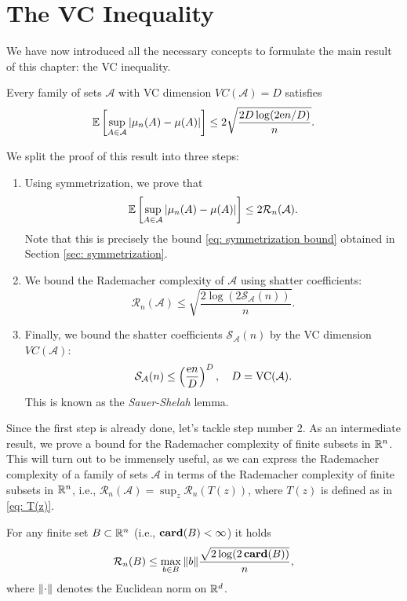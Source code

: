 \section{The VC Inequality}
\label{sec: VC inequality}

We have now introduced all the necessary concepts to formulate the main result of this chapter: the VC inequality.

\begin{theorem}[VC Inequality]
Every family of sets $\mathcal{A}$ with VC dimension $VC(\mathcal{A}) = D$ satisfies
\[
    \mathbb{E}\left[ \sup_{A \in \mathcal{A}} \abs{\mu_n(A) - \mu(A)} \right] \leq 2 \sqrt{\frac{2D \log(2 \mathrm{e} n / D)}{n}}.
\]
\end{theorem}

We split the proof of this result into three steps:

\begin{enumerate}
    \item Using symmetrization, we prove that
    \[
        \mathbb{E}\left[ \sup_{A \in \mathcal{A}} \abs{\mu_n(A) - \mu(A)} \right] \leq 2 \mathcal{R}_n(\mathcal{A}).
    \]
    Note that this is precisely the bound \eqref{eq: symmetrization bound} obtained in Section \ref{sec: symmetrization}.

    \item We bound the Rademacher complexity of $\mathcal{A}$ using shatter coefficients:
    \[
        \mathcal{R}_n(\mathcal{A}) \leq \sqrt{ \frac{2 \log(2 \mathcal{S}_{\mathcal{A}}(n)) }{n} }.
    \]

    \item Finally, we bound the shatter coefficients $\mathcal{S}_{\mathcal{A}}(n)$ by the VC dimension $VC(\mathcal{A})$:
    \[
        \mathcal{S}_{\mathcal{A}}(n) \leq \left( \frac{\mathrm{e} n}{D} \right)^D, \quad D = \mathrm{VC}(\mathcal{A}).
    \]
    This is known as the \emph{Sauer-Shelah} lemma.
\end{enumerate}

Since the first step is already done, let's tackle step number 2. As an intermediate result, we prove a bound for the Rademacher complexity of finite subsets in $\mathbb{R}^n$. This will turn out to be immensely useful, as we can express the Rademacher complexity of a family of sets $\mathcal{A}$ in terms of the Rademacher complexity of finite subsets in $\mathbb{R}^n$, i.e., $\mathcal{R}_n(\mathcal{A}) = \sup_z \mathcal{R}_n(T(z))$, where $T(z)$ is defined as in \eqref{eq: T(z)}.

\begin{lemma}
\label{lem: bound on rademacher complexity of finite set}
For any finite set $B \subset \mathbb{R}^n$ (i.e., $\mathrm{\mathbf{card}}(B) < \infty$) it holds
\[
    \mathcal{R}_n(B) \leq \max_{b \in B} \norm{b} \frac{\sqrt{2 \log(2 \, \mathrm{\mathbf{card}}(B))}}{n},
\]
where $\norm{\cdot}$ denotes the Euclidean norm on $\mathbb{R}^d$.
\end{lemma}

